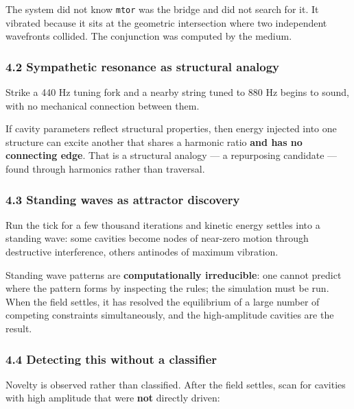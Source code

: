 \documentclass[
  11pt,
  a4paper,
]{article}
\begin{document}
The system did not know \texttt{mtor} was the bridge and did not search
for it. It vibrated because it sits at the geometric intersection where
two independent wavefronts collided. The conjunction was computed by the
medium.

\subsubsection{4.2 Sympathetic resonance as structural
analogy}\label{sympathetic-resonance-as-structural-analogy}

Strike a 440 Hz tuning fork and a nearby string tuned to 880 Hz begins
to sound, with no mechanical connection between them.

If cavity parameters reflect structural properties, then energy injected
into one structure can excite another that shares a harmonic ratio
\textbf{and has no connecting edge}. That is a structural analogy --- a
repurposing candidate --- found through harmonics rather than traversal.

\subsubsection{4.3 Standing waves as attractor
discovery}\label{standing-waves-as-attractor-discovery}

Run the tick for a few thousand iterations and kinetic energy settles
into a standing wave: some cavities become nodes of near-zero motion
through destructive interference, others antinodes of maximum vibration.

Standing wave patterns are \textbf{computationally irreducible}: one
cannot predict where the pattern forms by inspecting the rules; the
simulation must be run. When the field settles, it has resolved the
equilibrium of a large number of competing constraints simultaneously,
and the high-amplitude cavities are the result.

\subsubsection{4.4 Detecting this without a
classifier}\label{detecting-this-without-a-classifier}

Novelty is observed rather than classified. After the field settles,
scan for cavities with high amplitude that were \textbf{not} directly
driven:
\end{document}
